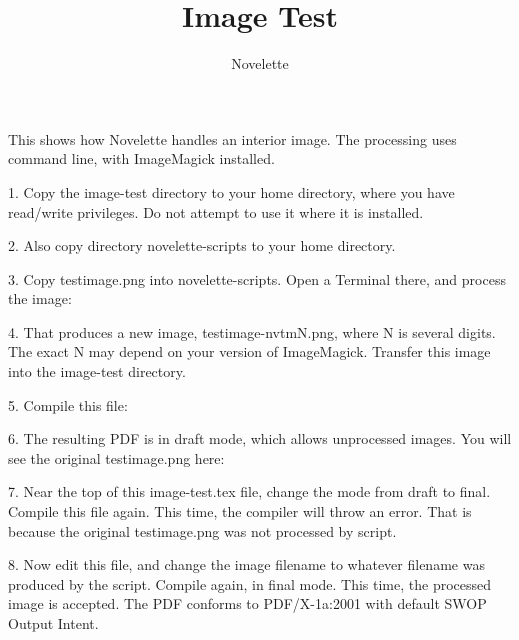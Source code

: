 \documentclass{novelette} %
\title{Image Test}
\author{Novelette}
\begin{document}
This shows how Novelette handles an interior image. The processing
uses  command line, with ImageMagick installed.

1. Copy the image-test directory to your home directory, where you
have read/write privileges. Do not attempt to use it where it is installed.

2. Also copy directory novelette-scripts to your home directory.

3. Copy testimage.png into novelette-scripts. Open a Terminal
there, and process the image:


4. That produces a new image, testimage-nvtmN.png, where N is several
digits. The exact N may depend on your version of ImageMagick. Transfer this
image into the image-test directory.

5. Compile this file: 

6. The resulting PDF is in draft mode, which allows unprocessed images.
You will see the original testimage.png here:


7. Near the top of this image-test.tex file, change the mode from
draft to final. Compile this file again. This time, the compiler will throw
an error. That is because the original testimage.png was not processed
by script.

8. Now edit this file, and change the image filename
to whatever filename was produced by the script. Compile again, in final
mode. This time, the processed image is accepted. The PDF conforms to
PDF/X-1a:2001 with default SWOP Output Intent.

\makeatletter\nocle@rtoendtrue\makeatother
\end{document}
